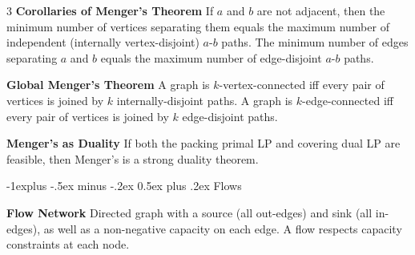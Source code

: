 \documentclass[10pt, landscape]{article}
\makeatletter
\renewcommand{\section}{\@startsection{section}{1}{0mm}%
                                {-1ex plus -.5ex minus -.2ex}%
                                {0.5ex plus .2ex}%
                                {\normalfont\large\bfseries}}
\renewcommand{\section}{\@startsection{section}{2}{0mm}%
                                {-1explus -.5ex minus -.2ex}%
                                {0.5ex plus .2ex}%
                                {\normalfont\normalsize\bfseries}}
\makeatother
\begin{document}
\begin{multicols*}{3}
\textbf{Corollaries of Menger's Theorem} If $a$ and $b$ are not adjacent, then the minimum number of vertices separating them equals the maximum number of independent (internally vertex-disjoint) $a$-$b$ paths. The minimum number of edges separating $a$ and $b$ equals the maximum number of edge-disjoint $a$-$b$ paths.

\textbf{Global Menger's Theorem} A graph is $k$-vertex-connected iff every pair of vertices is joined by $k$ internally-disjoint paths. A graph is $k$-edge-connected iff every pair of vertices is joined by $k$ edge-disjoint paths.





\textbf{Menger's as Duality} If both the packing primal LP and covering dual LP are feasible, then Menger's is a strong duality theorem.

\section{Flows}

\textbf{Flow Network} Directed graph with a source (all out-edges) and sink (all in-edges), as well as a non-negative capacity on each edge. A flow respects capacity constraints at each node.



\end{multicols*}
\end{document}
